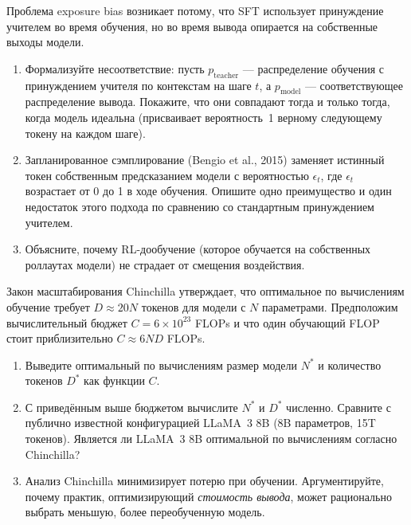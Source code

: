 \begin{exercise}
\label{ex:sft-exposure-bias}
Проблема exposure bias возникает потому, что SFT использует принуждение учителем во время обучения, но во время вывода опирается на собственные выходы модели.
\begin{enumerate}
  \item Формализуйте несоответствие: пусть $p_{\mathrm{teacher}}$ --- распределение обучения с принуждением учителя по контекстам на шаге $t$, а $p_{\mathrm{model}}$ --- соответствующее распределение вывода. Покажите, что они совпадают тогда и только тогда, когда модель идеальна (присваивает вероятность~1 верному следующему токену на каждом шаге).
  \item Запланированное сэмплирование (Bengio et al., 2015) заменяет истинный токен собственным предсказанием модели с вероятностью $\epsilon_t$, где $\epsilon_t$ возрастает от 0 до 1 в ходе обучения. Опишите одно преимущество и один недостаток этого подхода по сравнению со стандартным принуждением учителем.
  \item Объясните, почему RL-дообучение (которое обучается на собственных роллаутах модели) не страдает от смещения воздействия.
\end{enumerate}
\end{exercise}

\begin{exercise}
\label{ex:chinchilla}
Закон масштабирования Chinchilla утверждает, что оптимальное по вычислениям обучение требует $D \approx 20N$ токенов для модели с $N$ параметрами. Предположим вычислительный бюджет $C = 6 \times 10^{23}$ FLOPs и что один обучающий FLOP стоит приблизительно $C \approx 6ND$ FLOPs.
\begin{enumerate}
  \item Выведите оптимальный по вычислениям размер модели $N^*$ и количество токенов $D^*$ как функции $C$.
  \item С приведённым выше бюджетом вычислите $N^*$ и $D^*$ численно. Сравните с публично известной конфигурацией LLaMA~3 8B (8B параметров, 15T токенов). Является ли LLaMA~3 8B оптимальной по вычислениям согласно Chinchilla?
  \item Анализ Chinchilla минимизирует потерю при обучении. Аргументируйте, почему практик, оптимизирующий \emph{стоимость вывода}, может рационально выбрать меньшую, более переобученную модель.
\end{enumerate}
\end{exercise}

